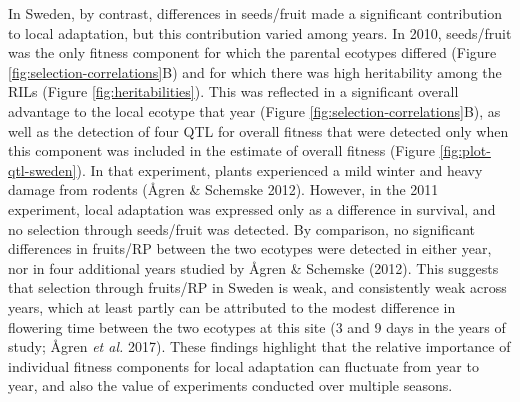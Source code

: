 \documentclass[
]{article}
\begin{document}
In Sweden, by contrast, differences in seeds/fruit made a significant contribution to local adaptation, but this contribution varied among years. In 2010, seeds/fruit was the only fitness component for which the parental ecotypes differed (Figure \ref{fig:selection-correlations}B) and for which there was high heritability among the RILs (Figure \ref{fig:heritabilities}). This was reflected in a significant overall advantage to the local ecotype that year (Figure \ref{fig:selection-correlations}B), as well as the detection of four QTL for overall fitness that were detected only when this component was included in the estimate of overall fitness (Figure \ref{fig:plot-qtl-sweden}). In that experiment, plants experienced a mild winter and heavy damage from rodents (Ågren \& Schemske 2012). However, in the 2011 experiment, local adaptation was expressed only as a difference in survival, and no selection through seeds/fruit was detected. By comparison, no significant differences in fruits/RP between the two ecotypes were detected in either year, nor in four additional years studied by Ågren \& Schemske (2012). This suggests that selection through fruits/RP in Sweden is weak, and consistently weak across years, which at least partly can be attributed to the modest difference in flowering time between the two ecotypes at this site (3 and 9 days in the years of study; Ågren \emph{et al.} 2017). These findings highlight that the relative importance of individual fitness components for local adaptation can fluctuate from year to year, and also the value of experiments conducted over multiple seasons.
\end{document}
